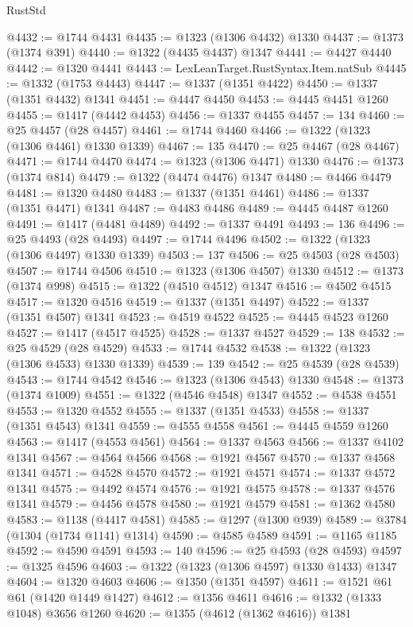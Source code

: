 \begin{lexlean}{RustStd}
\begin{coremodule}
@4432 := @1744 @4431
@4435 := @1323 (@1306 @4432) @1330
@4437 := @1373 (@1374 @391)
@4440 := @1322 (@4435 @4437) @1347
@4441 := @4427 @4440
@4442 := @1320 @4441
@4443 := LexLeanTarget.RustSyntax.Item.natSub
@4445 := @1332 (@1753 @4443)
@4447 := @1337 (@1351 @4422)
@4450 := @1337 (@1351 @4432) @1341
@4451 := @4447 @4450
@4453 := @4445 @4451 @1260
@4455 := @1417 (@4442 @4453)
@4456 := @1337 @4455
@4457 := 134
@4460 := @25 @4457 (@28 @4457)
@4461 := @1744 @4460
@4466 := @1322 (@1323 (@1306 @4461) @1330 @1339)
@4467 := 135
@4470 := @25 @4467 (@28 @4467)
@4471 := @1744 @4470
@4474 := @1323 (@1306 @4471) @1330
@4476 := @1373 (@1374 @814)
@4479 := @1322 (@4474 @4476) @1347
@4480 := @4466 @4479
@4481 := @1320 @4480
@4483 := @1337 (@1351 @4461)
@4486 := @1337 (@1351 @4471) @1341
@4487 := @4483 @4486
@4489 := @4445 @4487 @1260
@4491 := @1417 (@4481 @4489)
@4492 := @1337 @4491
@4493 := 136
@4496 := @25 @4493 (@28 @4493)
@4497 := @1744 @4496
@4502 := @1322 (@1323 (@1306 @4497) @1330 @1339)
@4503 := 137
@4506 := @25 @4503 (@28 @4503)
@4507 := @1744 @4506
@4510 := @1323 (@1306 @4507) @1330
@4512 := @1373 (@1374 @998)
@4515 := @1322 (@4510 @4512) @1347
@4516 := @4502 @4515
@4517 := @1320 @4516
@4519 := @1337 (@1351 @4497)
@4522 := @1337 (@1351 @4507) @1341
@4523 := @4519 @4522
@4525 := @4445 @4523 @1260
@4527 := @1417 (@4517 @4525)
@4528 := @1337 @4527
@4529 := 138
@4532 := @25 @4529 (@28 @4529)
@4533 := @1744 @4532
@4538 := @1322 (@1323 (@1306 @4533) @1330 @1339)
@4539 := 139
@4542 := @25 @4539 (@28 @4539)
@4543 := @1744 @4542
@4546 := @1323 (@1306 @4543) @1330
@4548 := @1373 (@1374 @1009)
@4551 := @1322 (@4546 @4548) @1347
@4552 := @4538 @4551
@4553 := @1320 @4552
@4555 := @1337 (@1351 @4533)
@4558 := @1337 (@1351 @4543) @1341
@4559 := @4555 @4558
@4561 := @4445 @4559 @1260
@4563 := @1417 (@4553 @4561)
@4564 := @1337 @4563
@4566 := @1337 @4102 @1341
@4567 := @4564 @4566
@4568 := @1921 @4567
@4570 := @1337 @4568 @1341
@4571 := @4528 @4570
@4572 := @1921 @4571
@4574 := @1337 @4572 @1341
@4575 := @4492 @4574
@4576 := @1921 @4575
@4578 := @1337 @4576 @1341
@4579 := @4456 @4578
@4580 := @1921 @4579
@4581 := @1362 @4580
@4583 := @1138 (@4417 @4581)
@4585 := @1297 (@1300 @939)
@4589 := @3784 (@1304 (@1734 @1141) @1314)
@4590 := @4585 @4589
@4591 := @1165 @1185
@4592 := @4590 @4591
@4593 := 140
@4596 := @25 @4593 (@28 @4593)
@4597 := @1325 @4596
@4603 := @1322 (@1323 (@1306 @4597) @1330 @1433) @1347
@4604 := @1320 @4603
@4606 := @1350 (@1351 @4597)
@4611 := @1521 @61 @61 (@1420 @1449 @1427)
@4612 := @1356 @4611
@4616 := @1332 (@1333 @1048) @3656 @1260
@4620 := @1355 (@4612 (@1362 @4616)) @1381

\end{coremodule}
\end{lexlean}
